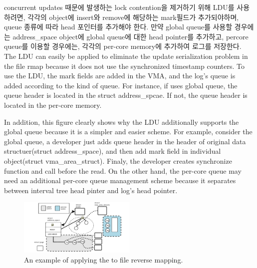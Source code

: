 \ifkor
concurrent updates 때문에 발생하는 lock contention을 제거하기 위해 LDU를 사용하려면,
각각의 object에 insert와 remove에 해당하는 mark필드가 추가되야하며, queue 종류에 따라 head 포인터를
추가해야 한다. 
만약 global queue를 사용할 경우에는 address\_space object에 global queue에 대한
head pointer를 추가하고, percore queue를 이용할 경우에는, 각각의 per-core memory에 추가하여 로그를 
저장한다. 
\else
The LDU can easily be applied to eliminate the update serialization problem in
the file rmap because it does not use the synchronized timestamp counters.
To use the LDU, the mark fields are added in the VMA, and 
the log's queue is added according to the kind of queue.
For instance, if uses global queue, the queue header is located in the struct
address\_spcae. If not, the queue header is located in the per-core memory.
\fi

\ifkor
\else
In addition, this figure clearly shows why the LDU additionally supports the
global queue because it is a simpler and easier scheme.
For example, consider the global queue, a developer just adds queue header in
the header of original data structuer(struct address\_space), and then add mark
field in individual object(struct vma\_area\_struct).
Finaly, the developer creates synchronize function and call before the
read.
On the other hand, the per-core queue may need an additional per-core
queue management scheme because it separates between interval tree head pinter
and log's head pointer.
\fi

\begin{figure}[tb]
  \begin{center}
     \includegraphics[width=0.5\textwidth,height=0.5\textheight,keepaspectratio]{fig/file_rmap}
  \end{center}
  \caption{An example of applying the  to file reverse mapping. }
  \label{fig:deferu}
\end{figure}



